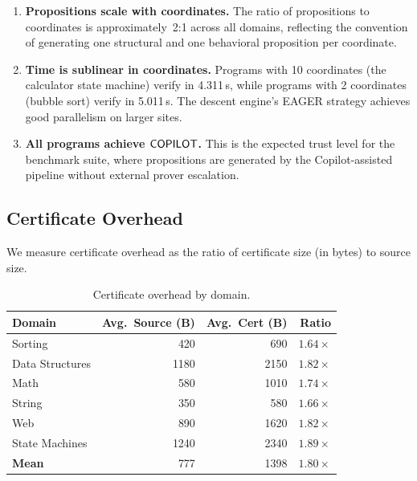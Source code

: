 \documentclass[11pt]{article}
\begin{document}
\begin{enumerate}
  \item \textbf{Propositions scale with coordinates.}  The ratio
    of propositions to coordinates is approximately~2:1 across all
    domains, reflecting the \JuGeo{} convention of generating one
    structural and one behavioral proposition per coordinate.

  \item \textbf{Time is sublinear in coordinates.}  Programs with
    10 coordinates (the calculator state machine) verify in 4.311\,s,
    while programs with 2 coordinates (bubble sort) verify in
    5.011\,s.  The descent engine's EAGER strategy achieves good
    parallelism on larger sites.

  \item \textbf{All programs achieve $\mathsf{COPILOT}$.}  This is the
    expected trust level for the benchmark suite, where propositions
    are generated by the \JuGeo{} Copilot-assisted pipeline without
    external prover escalation.
\end{enumerate}

\subsection{Certificate Overhead}

We measure certificate overhead as the ratio of certificate size
(in bytes) to source size.

\begin{table}[t]
\centering
\caption{Certificate overhead by domain.}
\label{tab:overhead}
\small
\begin{tabular}{@{}lrrr@{}}
\toprule
\textbf{Domain} & \textbf{Avg.\ Source (B)} & \textbf{Avg.\ Cert (B)} &
\textbf{Ratio} \\
\midrule
Sorting & 420 & 690 & $1.64\times$ \\
Data Structures & 1180 & 2150 & $1.82\times$ \\
Math & 580 & 1010 & $1.74\times$ \\
String & 350 & 580 & $1.66\times$ \\
Web & 890 & 1620 & $1.82\times$ \\
State Machines & 1240 & 2340 & $1.89\times$ \\
\midrule
\textbf{Mean} & 777 & 1398 & $1.80\times$ \\
\bottomrule
\end{tabular}
\end{table}
\end{document}
